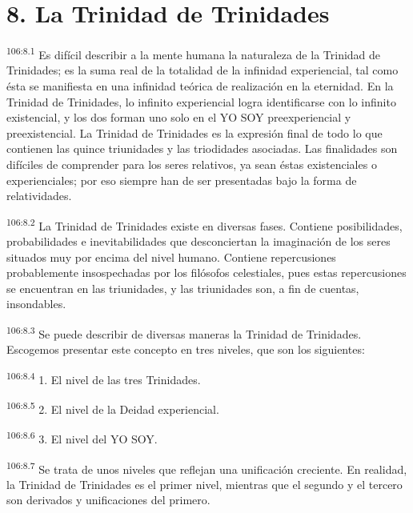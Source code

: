 \section*{8. La Trinidad de Trinidades}
\par
\textsuperscript{106:8.1} Es difícil describir a la mente humana la naturaleza de la Trinidad de Trinidades; es la suma real de la totalidad de la infinidad experiencial, tal como ésta se manifiesta en una infinidad teórica de realización en la eternidad. En la Trinidad de Trinidades, lo infinito experiencial logra identificarse con lo infinito existencial, y los dos forman uno solo en el YO SOY preexperiencial y preexistencial. La Trinidad de Trinidades es la expresión final de todo lo que contienen las quince triunidades y las triodidades asociadas. Las finalidades son difíciles de comprender para los seres relativos, ya sean éstas existenciales o experienciales; por eso siempre han de ser presentadas bajo la forma de relatividades.

\par
\textsuperscript{106:8.2} La Trinidad de Trinidades existe en diversas fases. Contiene posibilidades, probabilidades e inevitabilidades que desconciertan la imaginación de los seres situados muy por encima del nivel humano. Contiene repercusiones probablemente insospechadas por los filósofos celestiales, pues estas repercusiones se encuentran en las triunidades, y las triunidades son, a fin de cuentas, insondables.

\par
\textsuperscript{106:8.3} Se puede describir de diversas maneras la Trinidad de Trinidades. Escogemos presentar este concepto en tres niveles, que son los siguientes:

\par
\textsuperscript{106:8.4} 1. El nivel de las tres Trinidades.

\par
\textsuperscript{106:8.5} 2. El nivel de la Deidad experiencial.

\par
\textsuperscript{106:8.6} 3. El nivel del YO SOY.

\par
\textsuperscript{106:8.7} Se trata de unos niveles que reflejan una unificación creciente. En realidad, la Trinidad de Trinidades es el primer nivel, mientras que el segundo y el tercero son derivados y unificaciones del primero.

